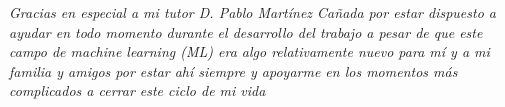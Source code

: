 


\textit{Gracias en especial a mi tutor D. Pablo Martínez Cañada por estar dispuesto a ayudar en todo momento durante el desarrollo del trabajo a pesar de que este campo de machine learning (ML) era algo relativamente nuevo para mí y a mi familia y amigos por estar ahí siempre y apoyarme en los momentos más complicados a cerrar este ciclo de mi vida}

\restoregeometry